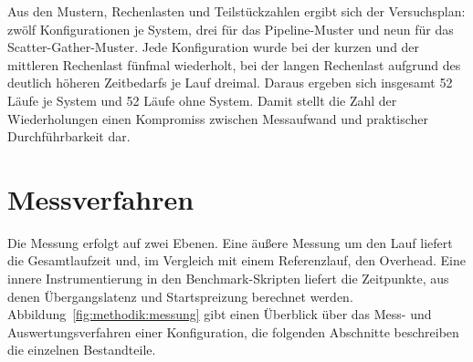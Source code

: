 Aus den Mustern, Rechenlasten und Teilstückzahlen ergibt sich der
Versuchsplan: zwölf Konfigurationen je System, drei für das Pipeline-Muster und neun für das Scatter-Gather-Muster. Jede Konfiguration wurde bei der kurzen und der mittleren Rechenlast fünfmal wiederholt, bei der langen Rechenlast aufgrund des deutlich höheren Zeitbedarfs je Lauf dreimal. Daraus ergeben sich insgesamt 52 Läufe je System und 52 Läufe ohne System. Damit stellt die Zahl der Wiederholungen einen Kompromiss zwischen Messaufwand und praktischer Durchführbarkeit dar.


\section{Messverfahren}
\label{sec:methodik:messverfahren}

Die Messung erfolgt auf zwei Ebenen. Eine äußere Messung um den
Lauf liefert die Gesamtlaufzeit und, im Vergleich mit einem
Referenzlauf, den Overhead. Eine innere Instrumentierung in den
Benchmark-Skripten liefert die Zeitpunkte, aus denen Übergangslatenz
und Startspreizung berechnet werden.
Abbildung~\ref{fig:methodik:messung} gibt einen Überblick über das
Mess- und Auswertungsverfahren einer Konfiguration, die folgenden
Abschnitte beschreiben die einzelnen Bestandteile.

